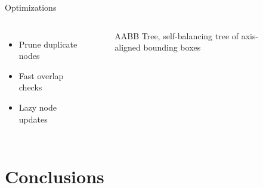 \documentclass{beamer}
\begin{document}
    \begin{frame}{Optimizations}
        \begin{columns}[onlytextwidth,T]
        \column{\dimexpr\linewidth-65mm-5mm}
            \begin{itemize}
                \item Prune duplicate nodes
                \item Fast overlap checks
                \item Lazy node updates
            \end{itemize}
        \column{65mm}
            \begin{figure}[h]
                \resizebox*{\columnwidth}{!}{%
                
                }
                \caption{AABB Tree, self-balancing tree of axis-aligned bounding boxes}
            \end{figure}
        \end{columns}
    \end{frame}

    \section{Conclusions}
\end{document}
